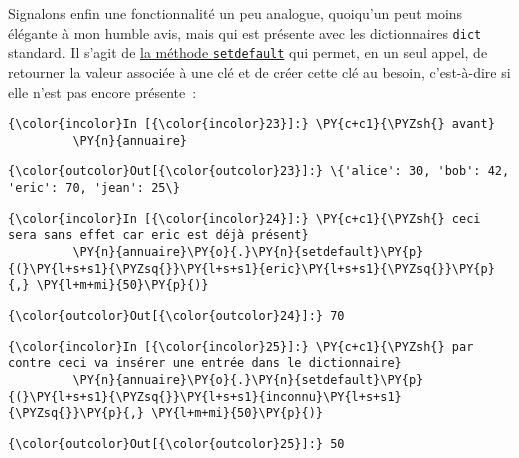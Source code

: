     Signalons enfin une fonctionnalité un peu analogue, quoiqu'un peut moins
élégante à mon humble avis, mais qui est présente avec les dictionnaires
\texttt{dict} standard. Il s'agit de
\href{https://docs.python.org/3/library/stdtypes.html\#dict.setdefault}{la
méthode \texttt{setdefault}} qui permet, en un seul appel, de retourner
la valeur associée à une clé et de créer cette clé au besoin,
c'est-à-dire si elle n'est pas encore présente~:

    \begin{Verbatim}[commandchars=\\\{\}]
{\color{incolor}In [{\color{incolor}23}]:} \PY{c+c1}{\PYZsh{} avant}
         \PY{n}{annuaire}
\end{Verbatim}


\begin{Verbatim}[commandchars=\\\{\}]
{\color{outcolor}Out[{\color{outcolor}23}]:} \{'alice': 30, 'bob': 42, 'eric': 70, 'jean': 25\}
\end{Verbatim}
            
    \begin{Verbatim}[commandchars=\\\{\}]
{\color{incolor}In [{\color{incolor}24}]:} \PY{c+c1}{\PYZsh{} ceci sera sans effet car eric est déjà présent}
         \PY{n}{annuaire}\PY{o}{.}\PY{n}{setdefault}\PY{p}{(}\PY{l+s+s1}{\PYZsq{}}\PY{l+s+s1}{eric}\PY{l+s+s1}{\PYZsq{}}\PY{p}{,} \PY{l+m+mi}{50}\PY{p}{)}
\end{Verbatim}


\begin{Verbatim}[commandchars=\\\{\}]
{\color{outcolor}Out[{\color{outcolor}24}]:} 70
\end{Verbatim}
            
    \begin{Verbatim}[commandchars=\\\{\}]
{\color{incolor}In [{\color{incolor}25}]:} \PY{c+c1}{\PYZsh{} par contre ceci va insérer une entrée dans le dictionnaire}
         \PY{n}{annuaire}\PY{o}{.}\PY{n}{setdefault}\PY{p}{(}\PY{l+s+s1}{\PYZsq{}}\PY{l+s+s1}{inconnu}\PY{l+s+s1}{\PYZsq{}}\PY{p}{,} \PY{l+m+mi}{50}\PY{p}{)}
\end{Verbatim}


\begin{Verbatim}[commandchars=\\\{\}]
{\color{outcolor}Out[{\color{outcolor}25}]:} 50
\end{Verbatim}
            
